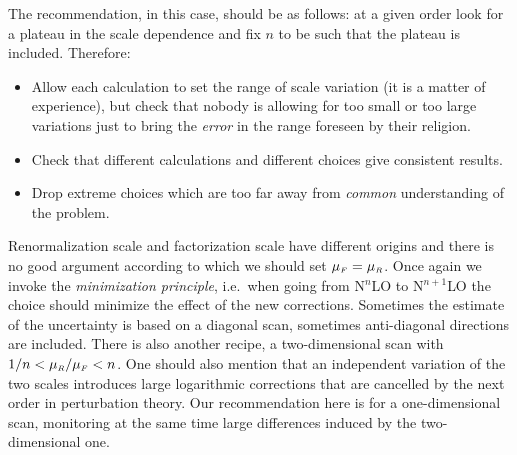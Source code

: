 The recommendation, in this case, should be as follows: at a given order
look for a plateau in the scale dependence and fix $n$ to be such that
the plateau is included. 
Therefore:
\begin{itemize}
\item Allow each calculation to set the range of scale variation (it is 
a matter of experience), but check that nobody is allowing for too small or
too large variations just to bring the {\em error} in the range 
foreseen by their religion.
\item Check that different calculations and different choices give
consistent results.
\item Drop extreme choices which are too far away from {\em common}
understanding of the problem. 
\end{itemize}
Renormalization scale and factorization scale have different origins and there
is no good argument according to which we should set 
$\mu_{{\scriptscriptstyle{F}}} = \mu_{{\scriptscriptstyle{R}}}$. Once again we invoke the {\em minimization
principle}, i.e.\ when going from N${}^n$LO to N$^{n+1}$LO the choice should 
minimize the effect of the new corrections.
Sometimes the estimate of the uncertainty is based on a diagonal scan, sometimes 
anti-diagonal directions are included. There is also another recipe, a 
two-dimensional scan with $1/n < \mu_{{\scriptscriptstyle{R}}}/\mu_{{\scriptscriptstyle{F}}} < n$. One should also 
mention that an independent variation of the two scales introduces large 
logarithmic corrections that are cancelled by the next order in perturbation theory.
Our recommendation here is for a one-dimensional scan, monitoring at the same time
large differences induced by the two-dimensional one.

